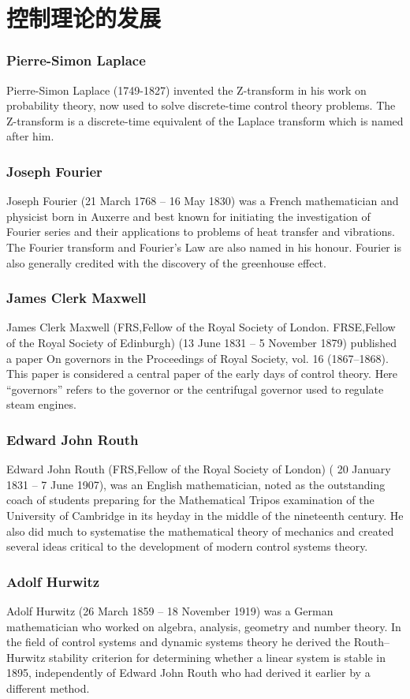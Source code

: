 \documentclass{beamer}
\begin{document}
\section{控制理论的发展}
\label{sec-2}
\begin{frame}
\frametitle{Pierre-Simon Laplace}
\label{sec-2-1}

   Pierre-Simon Laplace (1749-1827) invented the Z-transform in his work on probability theory, now used to solve discrete-time control theory problems. The Z-transform is a discrete-time equivalent of the Laplace transform which is named after him.
\end{frame}
\begin{frame}
\frametitle{Joseph Fourier}
\label{sec-2-2}

   Joseph Fourier (21 March 1768 – 16 May 1830) was a French mathematician and physicist born in Auxerre and best known for initiating the investigation of Fourier series and their applications to problems of heat transfer and vibrations. The Fourier transform and Fourier's Law are also named in his honour. Fourier is also generally credited with the discovery of the greenhouse effect.
\end{frame}
\begin{frame}
\frametitle{James Clerk Maxwell}
\label{sec-2-3}

   James Clerk Maxwell (FRS,Fellow of the Royal Society of London. FRSE,Fellow of the Royal Society of Edinburgh)  (13 June 1831 – 5 November 1879) published a paper On governors in the Proceedings of Royal Society, vol. 16 (1867–1868). This paper is considered a central paper of the early days of control theory. Here ``governors'' refers to the governor or the centrifugal governor used to regulate steam engines.
\end{frame}
\begin{frame}
\frametitle{Edward John Routh}
\label{sec-2-4}

   Edward John Routh (FRS,Fellow of the Royal Society of London) ( 20 January 1831 – 7 June 1907), was an English mathematician, noted as the outstanding coach of students preparing for the Mathematical Tripos examination of the University of Cambridge in its heyday in the middle of the nineteenth century. He also did much to systematise the mathematical theory of mechanics and created several ideas critical to the development of modern control systems theory.
\end{frame}
\begin{frame}
\frametitle{Adolf Hurwitz}
\label{sec-2-5}

   Adolf Hurwitz (26 March 1859 – 18 November 1919) was a German mathematician who worked on algebra, analysis, geometry and number theory. In the field of control systems and dynamic systems theory he derived the Routh–Hurwitz stability criterion for determining whether a linear system is stable in 1895, independently of Edward John Routh who had derived it earlier by a different method.
\end{frame}
\end{document}
